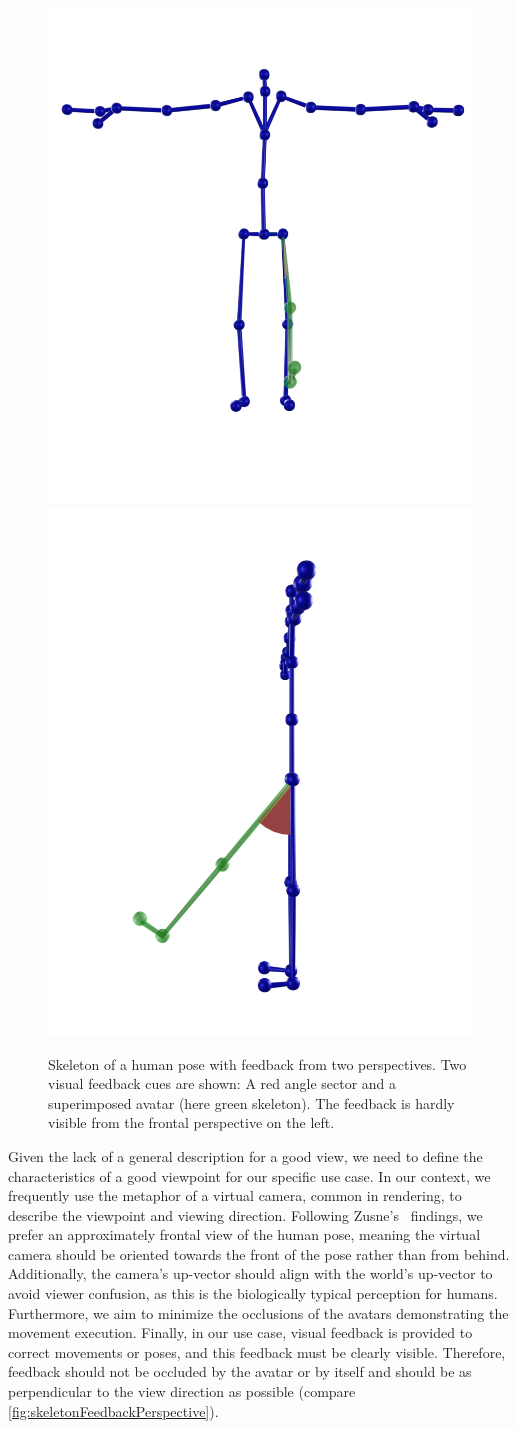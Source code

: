 \begin{figure}[t!h]
	\centering
	\includegraphics[width=0.49\linewidth]{pictures/feedbackFront.png}
	\includegraphics[width=0.49\linewidth]{pictures/feedbackSide.png}
	\caption[Skeleton of a human pose with feedback from two perspectives.]{Skeleton of a human pose with feedback from two perspectives. Two visual feedback cues are shown: A red angle sector and a superimposed avatar (here green skeleton). The feedback is hardly visible from the frontal perspective on the left.}
	\label{fig:skeletonFeedbackPerspective}
\end{figure}

Given the lack of a general description for a good view, we need to define the characteristics of a good viewpoint for our specific use case. In our context, we frequently use the metaphor of a virtual camera, common in rendering, to describe the viewpoint and viewing direction. Following Zusne's~\cite{zusne1970vpf} findings, we prefer an approximately frontal view of the human pose, meaning the virtual camera should be oriented towards the front of the pose rather than from behind. Additionally, the camera's up-vector should align with the world's up-vector to avoid viewer confusion, as this is the biologically typical perception for humans. Furthermore, we aim to minimize the occlusions of the avatars demonstrating the movement execution. Finally, in our use case, visual feedback is provided to correct movements or poses, and this feedback must be clearly visible. Therefore, feedback should not be occluded by the avatar or by itself and should be as perpendicular to the view direction as possible (compare \autoref{fig:skeletonFeedbackPerspective}).

